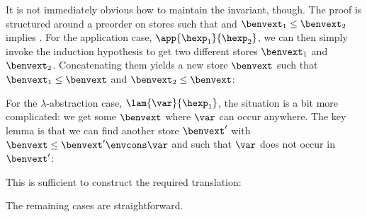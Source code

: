 It is not immediately obvious how to maintain the invariant, though.
The proof is structured around a preorder on stores such that  and $\benvext_1 \le \benvext_2$ implies .
For the application case, $\app{\hexp_1}{\hexp_2}$, we can then simply invoke the induction hypothesis to get two different stores $\benvext_1$ and $\benvext_2$.
Concatenating them yields a new store $\benvext$ such that $\benvext_1 \le \benvext$ and $\benvext_2 \le \benvext$:

For the $\lambda$-abstraction case, $\lam{\var}{\hexp_1}$, the situation is a bit more complicated: we get some $\benvext$ where $\var$ can occur anywhere.
The key lemma is that we can find another store $\benvext'$ with $\benvext \le \benvext' \envcons \var$ and such that $\var$ does not occur in $\benvext'$:

This is sufficient to construct the required translation:

The remaining cases are straightforward.
